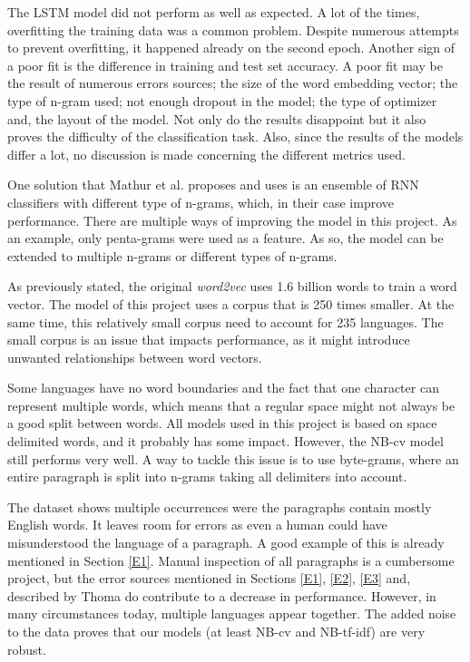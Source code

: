 \documentclass[conference]{IEEEtran}
\begin{document}
The LSTM model did not perform as well as expected. A lot of the times, overfitting the training data was a common problem. Despite numerous attempts to prevent overfitting, it happened already on the second epoch. Another sign of a poor fit is the difference in training and test set accuracy. A poor fit may be the result of numerous errors sources; the size of the word embedding vector; the type of n-gram used; not enough dropout in the model; the type of optimizer and, the layout of the model. Not only do the results disappoint but it also proves the difficulty of the classification task. Also, since the results of the models differ a lot, no discussion is made concerning the different metrics used.

One solution that Mathur et al. \cite{lide} proposes and uses is an ensemble of RNN classifiers with different type of n-grams, which, in their case improve performance. There are multiple ways of improving the model in this project. As an example, only penta-grams were used as a feature. As so, the model can be extended to multiple n-grams or different types of n-grams.

As previously stated, the original \textit{word2vec} uses 1.6 billion words to train a word vector. The model of this project uses a corpus that is 250 times smaller. At the same time, this relatively small corpus need to account for 235 languages. The small corpus is an issue that impacts performance, as it might introduce unwanted relationships between word vectors. 

Some languages have no word boundaries and the fact that one character can represent multiple words, which means that a regular space might not always be a good split between words. All models used in this project is based on space delimited words, and it probably has some impact. However, the NB-cv model still performs very well. A way to tackle this issue is to use byte-grams, where an entire paragraph is split into n-grams taking all delimiters into account.

The dataset shows multiple occurrences were the paragraphs contain mostly English words. It leaves room for errors as even a human could have misunderstood the language of a paragraph. A good example of this is already mentioned in Section \ref{E1}. Manual inspection of all paragraphs is a cumbersome project, but the error sources mentioned in Sections \ref{E1}, \ref{E2}, \ref{E3} and, described by Thoma \cite{wili} do contribute to a decrease in performance. However, in many circumstances today, multiple languages appear together. The added noise to the data proves that our models (at least NB-cv and NB-tf-idf) are very robust.
\end{document}
